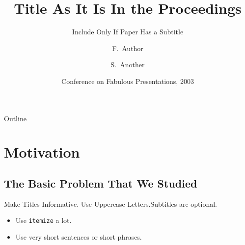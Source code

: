\documentclass{beamer}
\title[Short Paper Title] %
{Title As It Is In the Proceedings}
\subtitle
{Include Only If Paper Has a Subtitle}
\author[Author, Another] %
{F.~Author\inst{1} \and S.~Another\inst{2}}
\institute[Universities of Somewhere and Elsewhere] %
{
  \inst{1}%
  Department of Computer Science\\
  University of Somewhere
  \and
  \inst{2}%
  Department of Theoretical Philosophy\\
  University of Elsewhere}
\date[CFP 2003] %
{Conference on Fabulous Presentations, 2003}
\begin{document}
\begin{frame}
  \titlepage
\end{frame}

\begin{frame}{Outline}
  \tableofcontents
\end{frame}





\section{Motivation}

\subsection{The Basic Problem That We Studied}

\begin{frame}{Make Titles Informative. Use Uppercase Letters.}{Subtitles are optional.}

  \begin{itemize}
  \item
    Use \texttt{itemize} a lot.
  \item
    Use very short sentences or short phrases.
  \end{itemize}
\end{frame}
\end{document}
